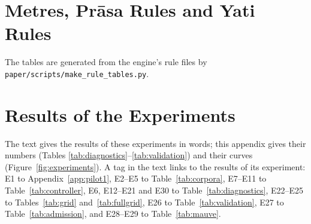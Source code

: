 \documentclass[11pt]{article}
\begin{document}
\onecolumn
\section{Metres, Prāsa Rules and Yati Rules}\label{app:rules}

The tables are generated from the engine's rule files by \texttt{paper/scripts/make\_rule\_tables.py}.
\captionsetup{font=scriptsize,skip=3pt}





\clearpage
\section{Results of the Experiments}\label{app:results}

{\small The text gives the results of these experiments in words; this appendix gives their numbers (Tables
\ref{tab:diagnostics}--\ref{tab:validation}) and their curves (Figure~\ref{fig:experiments}). A tag in the
text links to the results of its experiment: E1 to Appendix~\ref{app:pilot1}, E2--E5 to
Table~\ref{tab:corpora}, E7--E11 to Table~\ref{tab:controller}, E6, E12--E21 and E30 to
Table~\ref{tab:diagnostics}, E22--E25 to Tables~\ref{tab:grid} and~\ref{tab:fullgrid}, E26 to
Table~\ref{tab:validation}, E27 to Table~\ref{tab:admission}, and E28--E29 to Table~\ref{tab:mauve}.\par}
\medskip
\end{document}
